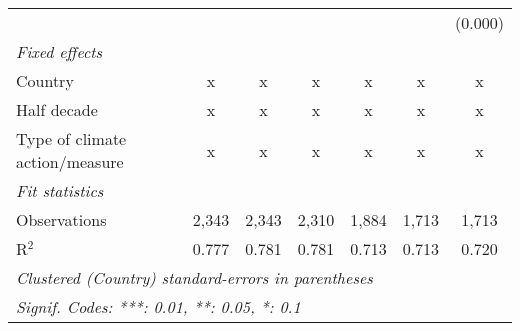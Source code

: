 \begin{tabular}{lcccccc}
                                                               &         &         &              &               &               & (0.000)\\   
   \emph{Fixed effects}\\
   Country                                                     & x       & x       & x            & x             & x             & x\\  
   Half decade                                                 & x       & x       & x            & x             & x             & x\\  
   Type of climate action/measure                              & x       & x       & x            & x             & x             & x\\  
   \midrule \emph{Fit statistics}\\
   Observations                                                & 2,343   & 2,343   & 2,310        & 1,884         & 1,713         & 1,713\\  
   R$^2$                                                       & 0.777   & 0.781   & 0.781        & 0.713         & 0.713         & 0.720\\  
   \midrule
   \multicolumn{7}{l}{\emph{Clustered (Country) standard-errors in parentheses}}\\
   \multicolumn{7}{l}{\emph{Signif. Codes: ***: 0.01, **: 0.05, *: 0.1}}\\
\end{tabular}
\par\endgroup


